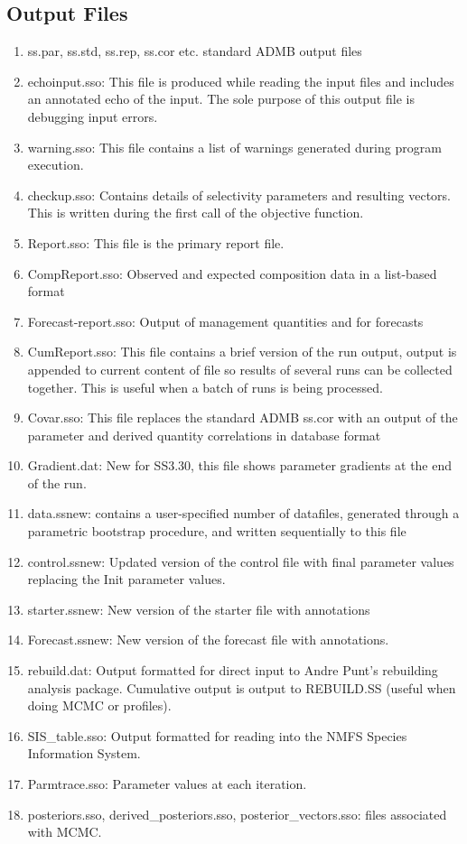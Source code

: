	\subsection{Output Files}
	\begin{enumerate}
		\item ss.par, ss.std, ss.rep, ss.cor etc.  standard ADMB output files
		\item echoinput.sso:  This file is produced while reading the input files and includes an annotated echo of the input.  The sole purpose of this output file is debugging input errors.
		\item warning.sso:  This file contains a list of warnings generated during program execution.
		\item checkup.sso:  Contains details of selectivity parameters and resulting vectors.  This is written during the first call of the objective function.
		\item Report.sso:  This file is the primary report file.
		\item CompReport.sso:  Observed and expected composition data in a list-based format
		\item Forecast-report.sso:  Output of management quantities and for forecasts
		\item CumReport.sso:  This file contains a brief version of the run output, output is appended to current content of file so results of several runs can be collected together.  This is useful when a batch of runs is being processed.
		\item Covar.sso:  This file replaces the standard ADMB ss.cor with an output of the parameter and derived quantity correlations in database format
		\item Gradient.dat: New for SS3.30, this file shows parameter gradients at the end of the run.
		\item data.ss\textunderscore new:  contains a user-specified number of datafiles, generated through a parametric bootstrap procedure, and written sequentially to this file
		\item control.ss\textunderscore new:  Updated version of the control file with final parameter values replacing the Init parameter values.
		\item starter.ss\textunderscore new:  New version of the starter file with annotations
		\item Forecast.ss\textunderscore new:  New version of the forecast file with annotations.
		\item rebuild.dat:  Output formatted for direct input to Andre Punt's rebuilding analysis package.  Cumulative output is output to REBUILD.SS (useful when doing MCMC or profiles).
		\item SIS\_table.sso:  Output formatted for reading into the NMFS Species Information System.
		\item Parmtrace.sso: Parameter values at each iteration.
		\item posteriors.sso, derived\_posteriors.sso, posterior\_vectors.sso: files associated with MCMC.
	\end{enumerate}

